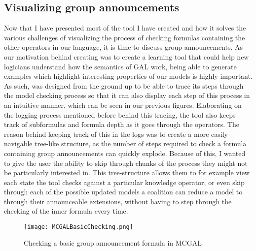 \subsection{Visualizing group announcements}

Now that I have presented most of the tool I have created and how it solves the various challenges of visualizing the process of checking formulas containing the other operators in our language, it is time to discuss group announcements. As our motivation behind creating \cname{} was to create a learning tool that could help new logicians understand how the semantics of GAL work, being able to generate examples which highlight interesting properties of our models is highly important. As such, \cname{} was designed from the ground up to be able to trace its steps through the model checking process so that it can also display each step of this process in an intuitive manner, which can be seen in our previous figures. Elaborating on the logging process mentioned before behind this tracing, the tool also keeps track of subformulas and formula depth as it goes through the operators. The reason behind keeping track of this in the logs was to create a more easily navigable tree-like structure, as the number of steps required to check a formula containing group announcements can quickly explode. Because of this, I wanted to give the user the ability to skip through chunks of the process they might not be particularly interested in. This tree-structure allows them to for example view each state the tool checks against a particular knowledge operator, or even skip through each of the possible updated models a coalition can reduce a model to through their announceable extensions, without having to step through the checking of the inner formula every time. 
 
\begin{figure}[]
	\texttt{[image: MCGALBasicChecking.png]}
	\caption{Checking a basic group announcement formula in MCGAL}
	\label{fig:basicGalChecking}
\end{figure}



